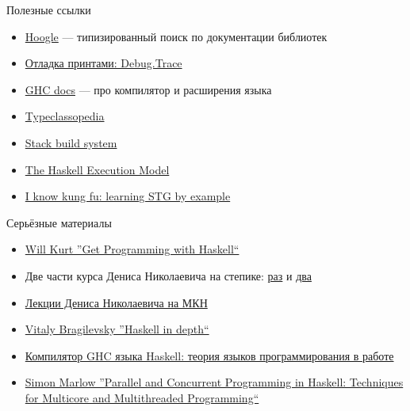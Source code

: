     \begin{frame}{Полезные ссылки}
        \begin{itemize}
            \item \href{https://hoogle.haskell.org/}{\color{blue} Hoogle} --- типизированный поиск по документации библиотек
            \item \href{https://hackage.haskell.org/package/base-4.18.1.0/docs/Debug-Trace.html}{\color{blue} Отладка принтами: Debug.Trace}
            \item \href{https://ghc.gitlab.haskell.org/ghc/doc/users_guide/index.html}{\color{blue} GHC docs} --- про компилятор и расширения языка
            \item \href{https://wiki.haskell.org/Typeclassopedia}{\color{blue} Typeclassopedia}
            \item \href{https://docs.haskellstack.org/en/stable/}{\color{blue} Stack build system}
            \item \href{https://gitlab.haskell.org/ghc/ghc/-/wikis/commentary/rts/haskell-execution}{\color{blue} The Haskell Execution Model}
            \item \href{https://gitlab.haskell.org/ghc/ghc/-/wikis/commentary/compiler/generated-code}{\color{blue} I know kung fu: learning STG by example}
        \end{itemize}
    \end{frame}

    \begin{frame}{Серьёзные материалы}
        \begin{itemize}
            \item \href{https://www.amazon.com/Get-Programming-Haskell-Will-Kurt/dp/1617293768}{\color{blue} Will Kurt ''Get Programming with Haskell``}
            \item Две части курса Дениса Николаевича на степике: \href{https://stepik.org/course/75/syllabus}{\color{blue} раз} и \href{https://stepik.org/course/693/syllabus}{\color{blue} два}
            \item \href{https://www.youtube.com/playlist?list=PL-_cKNuVAYAVX_q9XOKoFm95234G6YfOj}{\color{blue} Лекции Дениса Николаевича на МКН}
            \item \href{https://www.amazon.com/Haskell-Depth-Vitaly-Bragilevsky-ebook/dp/B098C6ZFZR}{\color{blue} Vitaly Bragilevsky ''Haskell in depth``}
            \item \href{https://www.youtube.com/watch?v=DS0dgYVnHy4&list=PLvPsfYrGz3wtQeNnms4dKnqqguoEb5TPx}{\color{blue} Компилятор GHC языка Haskell: теория языков программирования в работе}
            \item \href{https://www.amazon.com/Parallel-Concurrent-Programming-Haskell-Multithreaded/dp/1449335942}{\color{blue} Simon Marlow ''Parallel and Concurrent Programming in Haskell: Techniques for Multicore and Multithreaded Programming``}
        \end{itemize}
    \end{frame}


